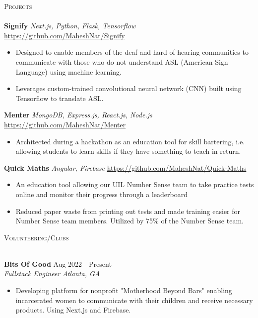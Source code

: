 \documentclass[a4paper]{article}
\newcommand{\lineunder} {
    \vspace*{-8pt} \\
    \hspace*{-18pt} \hrulefill \\
}
\newcommand{\header} [1] {
    {\hspace*{-18pt}\vspace*{6pt} \textsc{#1}}
    \vspace*{-6pt} \lineunder
}
\begin{document}
\header{Projects}
{\textbf{Signify}} {\sl Next.js, Python, Flask, Tensorflow} \hfill \url{https://github.com/MaheshNat/Signify}\\
\begin{itemize} \itemsep -1pt
	\item Designed to enable members of the deaf and hard of hearing communities to communicate with those who do not understand ASL (American Sign Language) using machine learning.
	\item Leverages custom-trained convolutional neural network (CNN) built using Tensorflow to translate ASL.
\end{itemize}
\vspace*{1mm}
{\textbf{Menter}} {\sl MongoDB, Express.js, React.js, Node.js} \hfill \url{https://github.com/MaheshNat/Menter}\\
\begin{itemize} \itemsep -1pt
	\item Architected during a hackathon as an education tool for skill bartering, i.e. allowing students to learn skills if they have something to teach in return.
\end{itemize}
\vspace*{1mm}
{\textbf{Quick Maths}} {\sl Angular, Firebase} \hfill \url{https://github.com/MaheshNat/Quick-Maths} \\
\begin{itemize} \itemsep -1pt\textit{\textit{\textit{\textit{\textit{}}}}}
	\item An education tool allowing our UIL Number Sense team to take practice tests online and monitor their progress through a leaderboard
        \item Reduced paper waste from printing out tests and made training easier for Number Sense team members. Utilized by 75\% of the Number Sense team.
\end{itemize}
\vspace*{1mm}

\header{Volunteering/Clubs}
\vspace{1mm}

\textbf{Bits Of Good} \hfill Aug 2022 - Present\\
\textit{Fullstack Engineer} \hfill \textit{Atlanta, GA} \\
\vspace{-1mm}
\begin{itemize} \itemsep -1pt
	\item Developing platform for nonprofit "Motherhood Beyond Bars" enabling incarcerated women to communicate with their children and receive necessary products. Using Next.js and Firebase.
\end{itemize}
\end{document}
